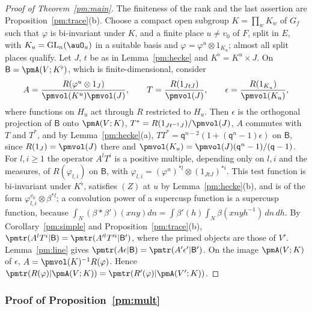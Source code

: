 \documentclass[10pt]{amsart}
\theoremstyle{definition}
\theoremstyle{remark}
\providecommand{\auGL}{\mathrm{GL}}
\begin{document}
\begin{proof}[Proof of Theorem~\ref{pm:main}]
The finiteness of the rank and the last assertion are Proposition~\ref{pm:trace}(b). Choose a
compact open subgroup $K=\prod_wK_w$ of $G_f$ such that $\varphi$ is bi-invariant under $K$, and a
finite place $u\ne v_0$ of $F$, split in $E$, with $K_u=\auGL_n(\auO_u)$ in a suitable basis and
$\varphi=\varphi^u\otimes1_{K_u}$; almost all split places qualify. Let $J$, $t$ be as in
Lemma~\ref{pm:hecke} and $K^\flat=K^u\times J$. On $\mathsf B=\pmA(V;K^\flat)$, which is
finite-dimensional, consider
\[
A=\frac{R(\varphi^u\otimes1_J)}{\pmvol(K^u)\pmvol(J)},\qquad T=\frac{R(1_{JtJ})}{\pmvol(J)},\qquad
\epsilon=\frac{R(1_{K_u})}{\pmvol(K_u)},
\]
where functions on $H_u$ act through $R$ restricted to $H_u$. Then $\epsilon$ is the orthogonal
projection of $\mathsf B$ onto $\pmA(V;K)$, $T^*=R(1_{Jt^{-1}J})/\pmvol(J)$, $A$ commutes with $T$
and $T^*$, and by Lemma~\ref{pm:hecke}(a), $TT^*=\mathsf q^{n-2}(1+(\mathsf q^n-1)\epsilon)$ on
$\mathsf B$, since $R(1_J)=\pmvol(J)$ there and $\pmvol(K_u)=\pmvol(J)(\mathsf q^n-1)/(\mathsf q-1)$.
For $l,i\ge1$ the operator $A^lT^i$ is a positive multiple, depending only on $l,i$ and the
measures, of $R(\varphi_{l,i})$ on $\mathsf B$, with $\varphi_{l,i}=(\varphi^u)^{*l}\otimes(1_{JtJ})^{*i}$.
This test function is bi-invariant under $K^\flat$, satisfies $(Z)$ at $u$ by
Lemma~\ref{pm:hecke}(b), and is of the form $\varphi_{l,i}^{v_0}\otimes\beta^{*l}$; a convolution
power of a supercusp function is a supercusp function, because
$\int_N(\beta*\beta')(xny)dn=\int\beta'(h)\int_N\beta(xnyh^{-1})\,dn\,dh$. By
Corollary~\ref{pm:simple} and Proposition~\ref{pm:trace}(b), $\pmtr(A^lT^i|\mathsf B)=\pmtr(A'^l
T'^i|\mathsf B')$, where the primed objects are those of $V'$. Lemma~\ref{pm:line} gives
$\pmtr(A\epsilon|\mathsf B)=\pmtr(A'\epsilon'|\mathsf B')$. On the image $\pmA(V;K)$ of $\epsilon$,
$A=\pmvol(K)^{-1}R(\varphi)$. Hence $\pmtr(R(\varphi)|\pmA(V;K))=\pmtr(R'(\varphi)|\pmA(V';K))$.
\end{proof}

\subsubsection{Proof of Proposition~\ref{pm:mult}}\label{pm:ss-mult}
\end{document}
